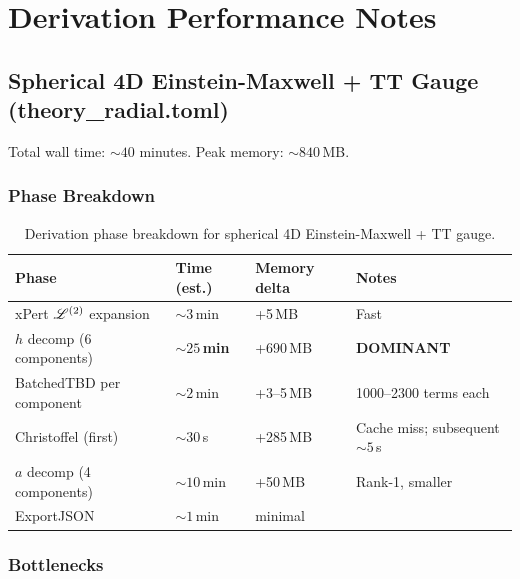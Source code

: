 
\section{Derivation Performance Notes}
\label{sec:derivation-performance}

\subsection{Spherical 4D Einstein-Maxwell + TT Gauge (theory\_radial.toml)}
\label{sec:spherical-4d}

Total wall time: ${\sim}40$ minutes. Peak memory: ${\sim}840$\,MB.

\subsubsection{Phase Breakdown}

\begin{table}[htbp]
\centering
\caption{Derivation phase breakdown for spherical 4D Einstein-Maxwell + TT gauge.}
\label{tab:spherical-phases}
\begin{tabular}{@{}llll@{}}
\toprule
Phase & Time (est.) & Memory delta & Notes \\
\midrule
xPert $\mathscr{L}^{(2)}$ expansion & ${\sim}3$\,min & +5\,MB & Fast \\
$h$ decomp (6 components) & \textbf{${\sim}25$\,min} & +690\,MB & \textbf{DOMINANT} \\
\quad BatchedTBD per component & ${\sim}2$\,min & +3--5\,MB & 1000--2300 terms each \\
\quad Christoffel (first) & ${\sim}30$\,s & +285\,MB & Cache miss; subsequent ${\sim}5$\,s \\
$a$ decomp (4 components) & ${\sim}10$\,min & +50\,MB & Rank-1, smaller \\
ExportJSON & ${\sim}1$\,min & minimal & \\
\bottomrule
\end{tabular}
\end{table}

\subsubsection{Bottlenecks}

